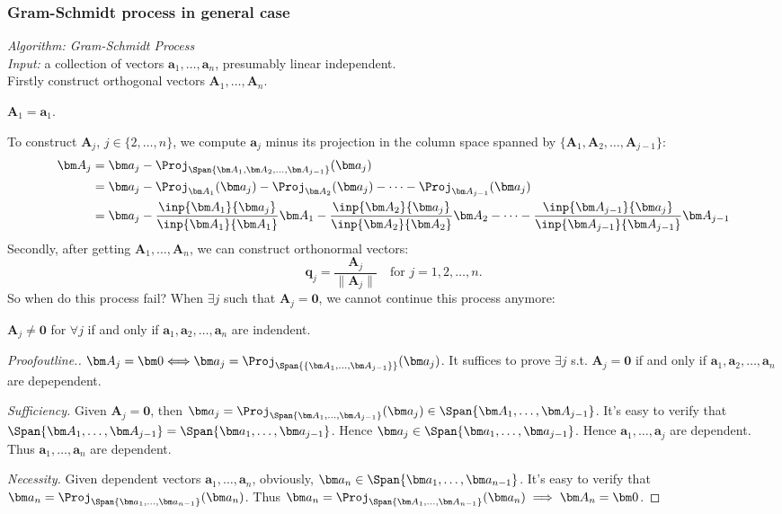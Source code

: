 \subsubsection{Gram-Schmidt process in general case}
\emph{Algorithm: Gram-Schmidt Process}\\
\emph{Input: }a collection of vectors $\bm a_1,\dots,\bm a_n$, presumably linear independent.\\
Firstly construct orthogonal vectors $\bm A_1,\dots,\bm A_n$.

$\bm A_1=\bm a_1$.

To construct $\bm A_j$, $j\in\{2,\dots,n\}$, we compute $\bm a_j$ minus its projection in the column space spanned by $\{\bm A_1,\bm A_2,\dots,\bm A_{j-1}\}$:
\[
\begin{aligned}
\bm A_j&=\bm a_j-\Proj_{\Span\{\bm A_1,\bm A_2,\dots,\bm A_{j-1}\}}(\bm a_j)\\
&=\bm a_j-\Proj_{\bm A_1}(\bm a_j)-\Proj_{\bm A_2}(\bm a_j)-\dots-\Proj_{\bm A_{j-1}}(\bm a_j)\\
&=\bm a_j-\frac{\inp{\bm A_1}{\bm a_j}}{\inp{\bm A_1}{\bm A_1}}\bm A_1-\frac{\inp{\bm A_2}{\bm a_j}}{\inp{\bm A_2}{\bm A_2}}\bm A_2-\dots-\frac{\inp{\bm A_{j-1}}{\bm a_j}}{\inp{\bm A_{j-1}}{\bm A_{j-1}}}\bm A_{j-1}
\end{aligned}
\]
Secondly, after getting $\bm A_1,\dots,\bm A_n$, we can construct orthonormal vectors:
\[
\bm q_j=\frac{\bm A_j}{\|\bm A_j\|}\quad\text{for }j=1,2,\dots,n.
\]
So when do this process fail? When $\exists j$ such that $\bm A_j=\bm 0$, we cannot continue this process anymore:
\begin{proposition}
$\bm A_j\ne\bm0$ for $\forall j$ if and only if $\bm a_1,\bm a_2,\dots,\bm a_n$ are indendent.
\end{proposition}
\begin{proof}[Proofoutline.]
$\bm A_j=\bm0\Longleftrightarrow
\bm a_j=\Proj_{\Span{\{\bm A_1,\dots,\bm A_{j-1}\}}}(\bm a_j)$. It suffices to prove $\exists j$ s.t. $\bm A_j=\bm 0$ if and only if $\bm a_1,\bm a_2,\dots,\bm a_n$ are depependent.

\textit{Sufficiency. }Given $\bm A_j=\bm0$, then $\bm a_j=\Proj_{\Span{\bm A_1,\dots,\bm A_{j-1}}}(\bm a_j)\in\Span\{\bm A_1,\dots,\bm A_{j-1}\}$. It's easy to verify that $\Span\{\bm A_1,\dots,\bm A_{j-1}\}=\Span\{\bm a_1,\dots,\bm a_{j-1}\}$. Hence $\bm a_j\in\Span\{\bm a_1,\dots,\bm a_{j-1}\}$. Hence $\bm a_1,\dots,\bm a_j$ are dependent. Thus $\bm a_1,\dots,\bm a_n$ are dependent.

\textit{Necessity. }Given dependent vectors $\bm a_1,\dots,\bm a_n$, obviously, $\bm a_n\in\Span\{\bm a_1,\dots,\bm a_{n-1}\}$. It's easy to verify that $\bm a_n=\Proj_{\Span\{\bm  a_1,\dots,\bm a_{n-1}\}}(\bm a_n)$. Thus $\bm a_n=\Proj_{\Span\{\bm A_1,\dots,\bm A_{n-1}\}}(\bm a_n)\implies \bm A_n=\bm0$.
\end{proof}
